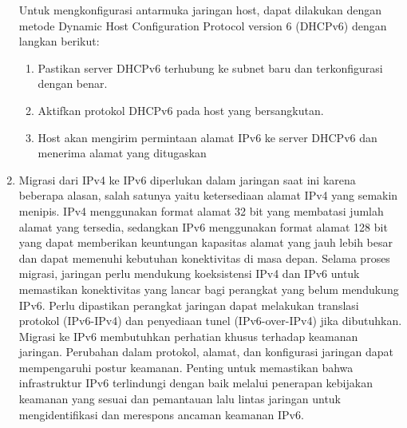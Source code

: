 \begin{enumerate}
\begin{enumerate}
    \end{enumerate}

    Untuk mengkonfigurasi antarmuka jaringan host, dapat dilakukan dengan metode Dynamic Host Configuration Protocol version 6 (DHCPv6) dengan langkan berikut:

    \begin{enumerate}
        \item Pastikan server DHCPv6 terhubung ke subnet baru dan terkonfigurasi dengan benar.
        \item Aktifkan protokol DHCPv6 pada host yang bersangkutan.
        \item Host akan mengirim permintaan alamat IPv6 ke server DHCPv6 dan menerima alamat yang ditugaskan
    \end{enumerate}
    
    \item Migrasi dari IPv4 ke IPv6 diperlukan dalam jaringan saat ini karena beberapa alasan, salah satunya yaitu ketersediaan alamat IPv4 yang semakin menipis. IPv4 menggunakan format alamat 32 bit yang membatasi jumlah alamat yang tersedia, sedangkan IPv6 menggunakan format alamat 128 bit yang dapat memberikan keuntungan kapasitas alamat yang jauh lebih besar dan dapat memenuhi kebutuhan konektivitas di masa depan. Selama proses migrasi, jaringan perlu mendukung koeksistensi IPv4 dan IPv6 untuk memastikan konektivitas yang lancar bagi perangkat yang belum mendukung IPv6. Perlu dipastikan perangkat jaringan dapat melakukan translasi protokol (IPv6-IPv4) dan penyediaan tunel (IPv6-over-IPv4) jika dibutuhkan. Migrasi ke IPv6 membutuhkan perhatian khusus terhadap keamanan jaringan. Perubahan dalam protokol, alamat, dan konfigurasi jaringan dapat mempengaruhi postur keamanan. Penting untuk memastikan bahwa infrastruktur IPv6 terlindungi dengan baik melalui penerapan kebijakan keamanan yang sesuai dan pemantauan lalu lintas jaringan untuk mengidentifikasi dan merespons ancaman keamanan IPv6.
    
\end{enumerate}